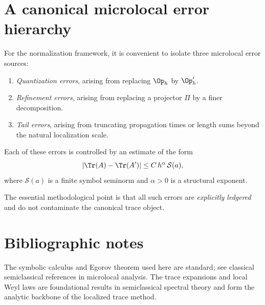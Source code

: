 \section{A canonical microlocal error hierarchy}
\label{sec:C.error-hierarchy}

For the normalization framework, it is convenient to isolate three microlocal error sources:

\begin{enumerate}
\item \emph{Quantization errors}, arising from replacing $\Op_h$ by $\Op'_h$.
\item \emph{Refinement errors}, arising from replacing a projector $\Pi$ by a finer decomposition.
\item \emph{Tail errors}, arising from truncating propagation times or length sums beyond the natural localization scale.
\end{enumerate}

Each of these errors is controlled by an estimate of the form
\[
|\Tr(A)-\Tr(A')|
\le
C\,h^\alpha\,\mathcal{S}(a),
\]
where $\mathcal{S}(a)$ is a finite symbol seminorm and $\alpha>0$ is a structural exponent.

The essential methodological point is that all such errors are \emph{explicitly ledgered} and do not contaminate the
canonical trace object.

\section*{Bibliographic notes}

The symbolic calculus and Egorov theorem used here are standard; see classical semiclassical references in microlocal
analysis.  The trace expansions and local Weyl laws are foundational results in semiclassical spectral theory and form
the analytic backbone of the localized trace method.

